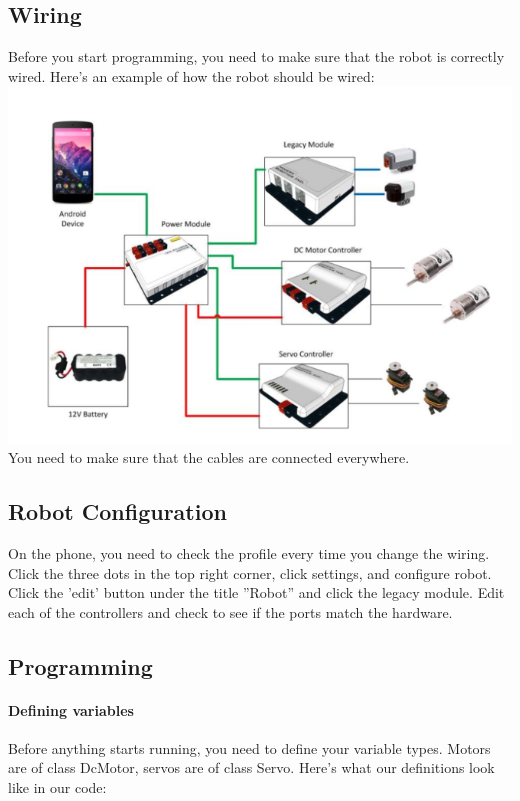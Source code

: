 \documentclass[12p,a4paper]{article}
\begin{document}
\subsection{Wiring}

Before you start programming, you need to make sure that the robot is correctly wired. Here's an example of how the robot should be wired:\\
\includegraphics[scale=0.3]{robot-wiring}\\
You need to make sure that the cables are connected everywhere.

\subsection{Robot Configuration}

On the phone, you need to check the profile every time you change the wiring. Click the three dots in the top right corner, click settings, and configure robot. Click the 'edit' button under the title ''Robot'' and click the legacy module. Edit each of the controllers and check to see if the ports match the hardware.
\subsection{Programming}

\paragraph{Defining variables}Before anything starts running, you need to define your variable types. Motors are of class DcMotor, servos are of class Servo. Here's what our definitions look like in our code:
\end{document}
